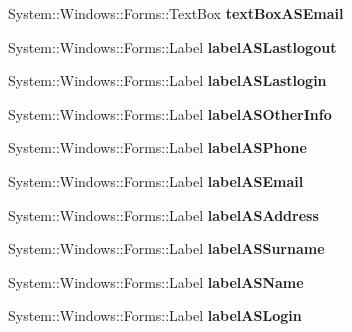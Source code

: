 \begin{DoxyCompactItemize}
System\+::\+Windows\+::\+Forms\+::\+Text\+Box {\bfseries text\+Box\+A\+S\+Email}
\item 
\hypertarget{class_magazyn_1_1_magazin_a688d1aa4c2c0caa6b5c7bc18966e2e04}{}\label{class_magazyn_1_1_magazin_a688d1aa4c2c0caa6b5c7bc18966e2e04} 
System\+::\+Windows\+::\+Forms\+::\+Label {\bfseries label\+A\+S\+Lastlogout}
\item 
\hypertarget{class_magazyn_1_1_magazin_a6dc6514f258dbd958a45ee1fd18113e5}{}\label{class_magazyn_1_1_magazin_a6dc6514f258dbd958a45ee1fd18113e5} 
System\+::\+Windows\+::\+Forms\+::\+Label {\bfseries label\+A\+S\+Lastlogin}
\item 
\hypertarget{class_magazyn_1_1_magazin_af546b0c8a1b45a4486fae11325ceca3d}{}\label{class_magazyn_1_1_magazin_af546b0c8a1b45a4486fae11325ceca3d} 
System\+::\+Windows\+::\+Forms\+::\+Label {\bfseries label\+A\+S\+Other\+Info}
\item 
\hypertarget{class_magazyn_1_1_magazin_ae745782def85f536c0889769e9d53718}{}\label{class_magazyn_1_1_magazin_ae745782def85f536c0889769e9d53718} 
System\+::\+Windows\+::\+Forms\+::\+Label {\bfseries label\+A\+S\+Phone}
\item 
\hypertarget{class_magazyn_1_1_magazin_a5723f523ee5daed12fc185f03f2237f6}{}\label{class_magazyn_1_1_magazin_a5723f523ee5daed12fc185f03f2237f6} 
System\+::\+Windows\+::\+Forms\+::\+Label {\bfseries label\+A\+S\+Email}
\item 
\hypertarget{class_magazyn_1_1_magazin_a743c7017582bd833575009149422d7ea}{}\label{class_magazyn_1_1_magazin_a743c7017582bd833575009149422d7ea} 
System\+::\+Windows\+::\+Forms\+::\+Label {\bfseries label\+A\+S\+Address}
\item 
\hypertarget{class_magazyn_1_1_magazin_a7c771c8f301609ae9fb7c9553923470a}{}\label{class_magazyn_1_1_magazin_a7c771c8f301609ae9fb7c9553923470a} 
System\+::\+Windows\+::\+Forms\+::\+Label {\bfseries label\+A\+S\+Surname}
\item 
\hypertarget{class_magazyn_1_1_magazin_a7f9efc2d6a56ca1dc9af2692c08b18a1}{}\label{class_magazyn_1_1_magazin_a7f9efc2d6a56ca1dc9af2692c08b18a1} 
System\+::\+Windows\+::\+Forms\+::\+Label {\bfseries label\+A\+S\+Name}
\item 
\hypertarget{class_magazyn_1_1_magazin_ae10f1ea34807789b52f4392882f5f1a3}{}\label{class_magazyn_1_1_magazin_ae10f1ea34807789b52f4392882f5f1a3} 
System\+::\+Windows\+::\+Forms\+::\+Label {\bfseries label\+A\+S\+Login}
\item 
\hypertarget{class_magazyn_1_1_magazin_a1e64e3c36be7e9dd81587c200dc6ff33}{}\label{class_magazyn_1_1_magazin_a1e64e3c36be7e9dd81587c200dc6ff33} 

\end{DoxyCompactItemize}
